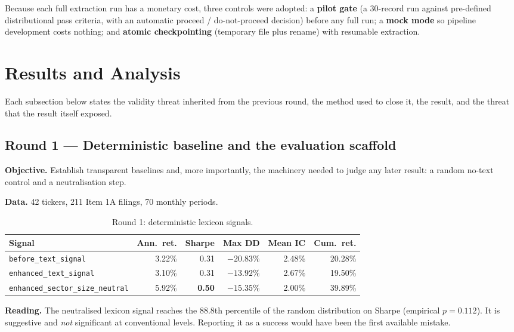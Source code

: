 \documentclass[11pt]{article}
\newcommand{\sig}[1]{\texttt{#1}}
\begin{document}
Because each full extraction run has a monetary cost, three controls were adopted:
a \textbf{pilot gate} (a 30-record run against pre-defined distributional pass criteria,
with an automatic proceed / do-not-proceed decision) before any full run; a \textbf{mock
mode} so pipeline development costs nothing; and \textbf{atomic checkpointing}
(temporary file plus rename) with resumable extraction.

\section{Results and Analysis}
\label{sec:results}

Each subsection below states the validity threat inherited from the previous round, the
method used to close it, the result, and the threat that the result itself exposed.

\subsection{Round 1 --- Deterministic baseline and the evaluation scaffold}

\textbf{Objective.} Establish transparent baselines and, more importantly, the machinery
needed to judge any later result: a random no-text control and a neutralisation step.

\textbf{Data.} 42 tickers, 211 Item 1A filings, 70 monthly periods.

\begin{table}[H]
\centering\small
\caption{Round 1: deterministic lexicon signals.}
\begin{tabular}{l r r r r r}
\toprule
\textbf{Signal} & \textbf{Ann.\ ret.} & \textbf{Sharpe} & \textbf{Max DD} & \textbf{Mean IC} & \textbf{Cum.\ ret.} \\
\midrule
\sig{before\_text\_signal}           & 3.22\% & 0.31 & $-20.83\%$ & 2.48\% & 20.28\% \\
\sig{enhanced\_text\_signal}         & 3.10\% & 0.31 & $-13.92\%$ & 2.67\% & 19.50\% \\
\sig{enhanced\_sector\_size\_neutral}& 5.92\% & \textbf{0.50} & $-15.35\%$ & 2.00\% & 39.89\% \\
\bottomrule
\end{tabular}
\end{table}

\textbf{Reading.} The neutralised lexicon signal reaches the 88.8th percentile of the
random distribution on Sharpe (empirical $p = 0.112$). It is suggestive and
\emph{not} significant at conventional levels. Reporting it as a success would have been
the first available mistake.
\end{document}
